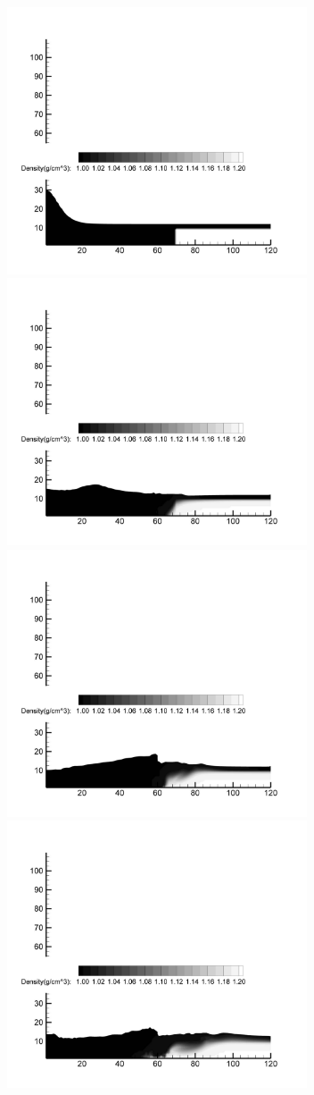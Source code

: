\begin{figure}[h]
\begin{center}
\includegraphics[width=3.5in]{../figures/SRM/SRM-DDM-000.pdf}
\includegraphics[width=3.5in]{../figures/SRM/SRM-DDM-025.pdf}
\includegraphics[width=3.5in]{../figures/SRM/SRM-DDM-050.pdf}
\includegraphics[width=3.5in]{../figures/SRM/SRM-DDM-075.pdf}

\end{center}
\end{figure}
